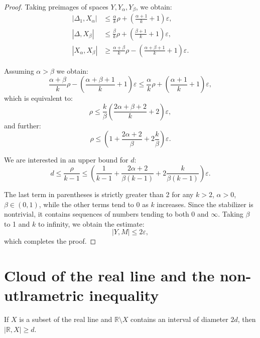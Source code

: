 \begin{proof}
  Taking preimages of spaces $Y, Y_{\alpha}, Y_{\beta}$, we obtain:
  \begin{align*}
    |\Delta_1, X_{\alpha}| &\leq \frac{\alpha}{k}\rho +
    \left(\frac{\alpha+1}{k} + 1\right)\varepsilon, \\
    |\Delta, X_{\beta}| &\leq \frac{\beta}{k}\rho +
    \left(\frac{\beta+1}{k}+1\right)\varepsilon, \\
    |X_\alpha, X_{\beta}| &\geq \frac{\alpha+\beta}{k}\rho -
    \left(\frac{\alpha+\beta+1}{k}+1\right)\varepsilon.
  \end{align*}

  Assuming $\alpha > \beta$ we obtain:
  $$
  \frac{\alpha+\beta}{k}\rho -
  \left(\frac{\alpha+\beta+1}{k}+1\right)\varepsilon \leq
  \frac{\alpha}{k}\rho + \left(\frac{\alpha+1}{k} + 1\right)\varepsilon,
  $$
  which is equivalent to:
  $$
  \rho \leq
  \frac{k}{\beta}\left(\frac{2\alpha+\beta+2}{k}+2\right)\varepsilon,
  $$
  and further:
  $$
  \rho \leq \left(1+\frac{2\alpha + 2}{\beta} +
  2\frac{k}{\beta}\right)\varepsilon.
  $$

  We are interested in an upper bound for $d$:
  $$
  d \leq \frac{\rho}{k-1} \leq \left(\frac{1}{k-1}+\frac{2\alpha +
  2}{\beta(k-1)} + 2\frac{k}{\beta(k-1)}\right)\varepsilon.
  $$

  The last term in parentheses is strictly greater than 2 for any
  $k>2$, $\alpha>0$, $\beta\in (0,1)$, while the other terms tend to
  0 as $k$ increases. Since the stabilizer is nontrivial, it contains
  sequences of numbers tending to both 0 and $\infty$. Taking $\beta$
  to 1 and $k$ to infinity, we obtain the estimate:
  $$
  |Y, M| \leq 2\varepsilon,
  $$
  which completes the proof.
\end{proof}

\section{Cloud of the real line and the non-utlrametric inequality}

\begin{lemma}\label{lemmaDiamDist}
  If $X$ is a subset of the real line and $\mathbb{R}\setminus X$
  contains an interval of diameter $2d$, then $|\mathbb{R}, X| \ge d$.
\end{lemma}

